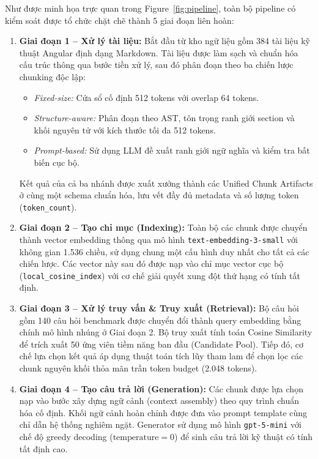 Như được minh họa trực quan trong Figure~\ref{fig:pipeline}, toàn bộ pipeline có kiểm soát được tổ chức chặt chẽ thành 5 giai đoạn liên hoàn:
\begin{enumerate}
    \item \textbf{Giai đoạn 1 -- Xử lý tài liệu:} Bắt đầu từ kho ngữ liệu gồm 384 tài liệu kỹ thuật Angular định dạng Markdown. Tài liệu được làm sạch và chuẩn hóa cấu trúc thông qua bước tiền xử lý, sau đó phân đoạn theo ba chiến lược chunking độc lập:
    \begin{itemize}
        \item \textit{Fixed-size:} Cửa sổ cố định 512 tokens với overlap 64 tokens.
        \item \textit{Structure-aware:} Phân đoạn theo AST, tôn trọng ranh giới section và khối nguyên tử với kích thước tối đa 512 tokens.
        \item \textit{Prompt-based:} Sử dụng LLM đề xuất ranh giới ngữ nghĩa và kiểm tra bất biến cục bộ.
    \end{itemize}
    Kết quả của cả ba nhánh được xuất xưởng thành các Unified Chunk Artifacts ở cùng một schema chuẩn hóa, lưu vết đầy đủ metadata và số lượng token (\texttt{token\_count}).

    \item \textbf{Giai đoạn 2 -- Tạo chỉ mục (Indexing):} Toàn bộ các chunk được chuyển thành vector embedding thông qua mô hình \texttt{text-embedding-3-small} với không gian 1.536 chiều, sử dụng chung một cấu hình duy nhất cho tất cả các chiến lược. Các vector này sau đó được nạp vào chỉ mục vector cục bộ (\texttt{local\_cosine\_index}) với cơ chế giải quyết xung đột thứ hạng có tính tất định.

    \item \textbf{Giai đoạn 3 -- Xử lý truy vấn \& Truy xuất (Retrieval):} Bộ câu hỏi gồm 140 câu hỏi benchmark được chuyển đổi thành query embedding bằng chính mô hình nhúng ở Giai đoạn 2. Bộ truy xuất tính toán Cosine Similarity để trích xuất 50 ứng viên tiềm năng ban đầu (Candidate Pool). Tiếp đó, cơ chế lựa chọn kết quả áp dụng thuật toán tích lũy tham lam để chọn lọc các chunk nguyên khối thỏa mãn trần token budget (2.048 tokens).

    \item \textbf{Giai đoạn 4 -- Tạo câu trả lời (Generation):} Các chunk được lựa chọn nạp vào bước xây dựng ngữ cảnh (context assembly) theo quy trình chuẩn hóa cố định. Khối ngữ cảnh hoàn chỉnh được đưa vào prompt template cùng chỉ dẫn hệ thống nghiêm ngặt. Generator sử dụng mô hình \texttt{gpt-5-mini} với chế độ greedy decoding ($\text{temperature} = 0$) để sinh câu trả lời kỹ thuật có tính tất định cao.


\end{enumerate}
